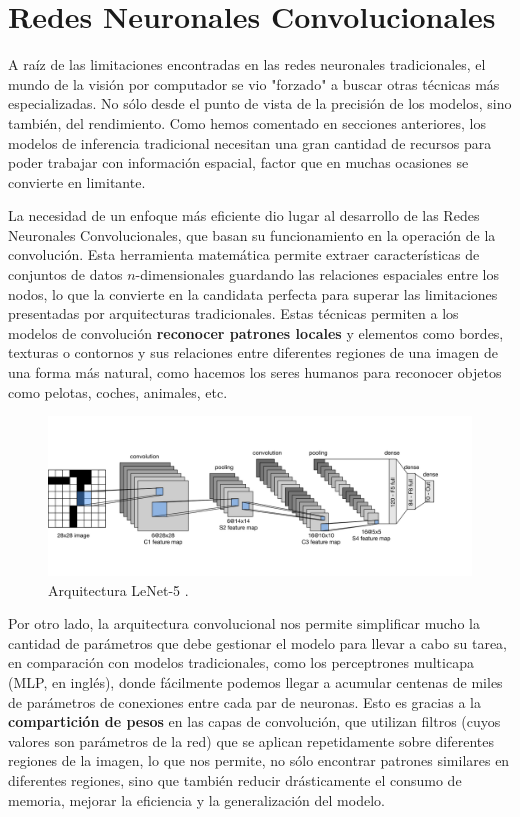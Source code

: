 \chapter{Redes Neuronales Convolucionales}\label{cap:red_neuronal_convolucional}

A raíz de las limitaciones encontradas en las redes neuronales tradicionales, el mundo de la visión por computador se vio "forzado" a buscar otras técnicas más especializadas. No sólo desde el punto de vista de la precisión de los modelos, sino también, del rendimiento. Como hemos comentado en secciones anteriores, los modelos de inferencia tradicional necesitan una gran cantidad de recursos para poder trabajar con información espacial, factor que en muchas ocasiones se convierte en limitante.

La necesidad de un enfoque más eficiente dio lugar al desarrollo de las Redes Neuronales Convolucionales, que basan su funcionamiento en la operación de la convolución. Esta herramienta matemática permite extraer características de conjuntos de datos $n$-dimensionales guardando las relaciones espaciales entre los nodos, lo que la convierte en la candidata perfecta para superar las limitaciones presentadas por arquitecturas tradicionales. Estas técnicas permiten a los modelos de convolución \textbf{reconocer patrones locales} y elementos como bordes, texturas o contornos y sus relaciones entre diferentes regiones de una imagen de una forma más natural, como hacemos los seres humanos para reconocer objetos como pelotas, coches, animales, etc.

\begin{figure}[ht]
	\centering
	\includegraphics[width=1\linewidth]{figures/ejemplos/LeNet-5_architecture.png}
	\caption{Arquitectura LeNet-5 \cite{zhang2023dive}.}
	\label{img:lenet-5}
\end{figure}

Por otro lado, la arquitectura convolucional nos permite simplificar mucho la cantidad de parámetros que debe gestionar el modelo para llevar a cabo su tarea, en comparación con modelos tradicionales, como los perceptrones multicapa (MLP, en inglés), donde fácilmente podemos llegar a acumular centenas de miles de parámetros de conexiones entre cada par de neuronas. Esto es gracias a la \textbf{compartición de pesos} en las capas de convolución, que utilizan filtros (cuyos valores son parámetros de la red) que se aplican repetidamente sobre diferentes regiones de la imagen, lo que nos permite, no sólo encontrar patrones similares en diferentes regiones, sino que también reducir drásticamente el consumo de memoria, mejorar la eficiencia y la generalización del modelo.

